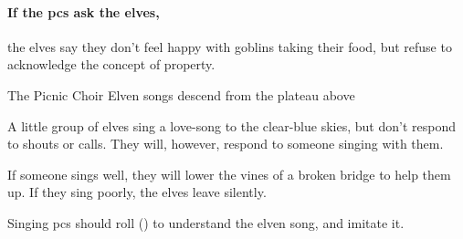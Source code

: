 

\paragraph{If the \glspl{pc} ask the elves,}
the elves say they don't feel happy with goblins taking their food, but refuse to acknowledge the concept of property.

{The Picnic Choir}%
{Elven songs descend from the plateau above}%

A little group of elves sing a love-song to the clear-blue skies, but don't respond to shouts or calls.
They will, however, respond to someone singing with them.

If someone sings well, they will lower the vines of a broken bridge to help them up.
If they sing poorly, the elves leave silently.

Singing \glspl{pc} should roll  (\tn[10]) to understand the elven song, and imitate it.

